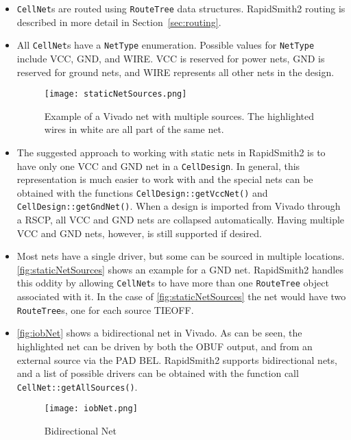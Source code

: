 \begin{itemize}
  \item \texttt{CellNet}s are routed using \texttt{RouteTree} data structures.
  RapidSmith2 routing is described in more detail in Section~\ref{sec:routing}.
  
  \item All \texttt{CellNet}s have a \texttt{NetType} enumeration. Possible values for
  \texttt{NetType} include VCC, GND, and WIRE. VCC is reserved for power nets, GND
  is reserved for ground nets, and WIRE represents all other nets in the design.
  
  \begin{figure}[t!]
   \centering
   \texttt{[image: staticNetSources.png]}
   \caption{Example of a Vivado net with multiple sources. The highlighted
   wires in white are all part of the same net.}
   \label{fig:staticNetSources}
  \end{figure}
  
  \item The suggested approach to working with static nets in RapidSmith2 is to
  have only one VCC and GND net in a \texttt{CellDesign}. In general, this
  representation is much easier to work with and the special nets
  can be obtained with the functions \texttt{CellDesign::getVccNet()}
  and \texttt{CellDesign::getGndNet()}. When a design is imported from Vivado
  through a RSCP, all VCC and GND nets are collapsed automatically. Having
  multiple VCC and GND nets, however, is still supported if desired.
  
  \item Most nets have a single driver, but some can be sourced in multiple
  locations. \autoref{fig:staticNetSources} shows an example for a GND
  net. RapidSmith2 handles this oddity by allowing \texttt{CellNet}s to have
  more than one \texttt{RouteTree} object associated with it. In the case of
  \autoref{fig:staticNetSources} the net would have two \texttt{RouteTree}s,
  one for each source TIEOFF.
  
  \item \autoref{fig:iobNet} shows a bidirectional net in Vivado. As can be
  seen, the highlighted net can be driven by both the OBUF output, and from an
  external source via the PAD BEL. RapidSmith2 supports bidirectional nets, 
  and a list of possible drivers can be obtained with the function call
  \texttt{CellNet::getAllSources()}.
  
  \begin{figure}[H]
   \centering
   \texttt{[image: iobNet.png]}
   \caption{Bidirectional Net}
   \label{fig:iobNet}
  \end{figure}


\end{itemize}
